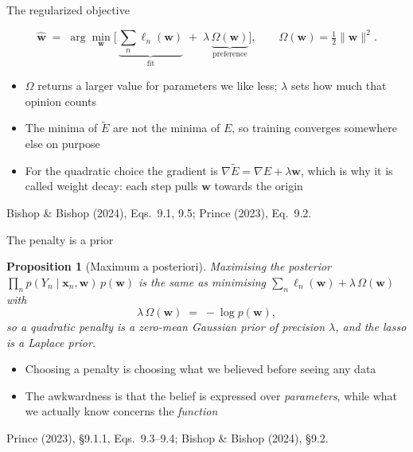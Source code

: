 \documentclass[aspectratio=169, 11pt]{beamer}
\newtheorem{propx}[theorem]{Proposition}
\newcommand{\srcline}[1]{%
  \par\vspace{0.25em}%
  {\scriptsize\color{mcMuted}\hfill #1\par}}
\newcommand{\src}[3]{}      %
\begin{document}
\begin{frame}{The regularized objective}
  \src{bishop2024}{equation}{9.1}
  \src{bishop2024}{equation}{9.5}
  \src{bishop2024}{section}{9.2}
  \src{prince2023}{equation}{9.2}
  \src{prince2023}{section}{9.1}
  \vspace{-0.2em}
  \[
    \hat{\mathbf{w}} \;=\; \arg\min_{\mathbf{w}}
      \Big[\, \underbrace{\textstyle\sum_{n} \ell_n(\mathbf{w})}_{\text{fit}}
        \;+\; \lambda\, \underbrace{\Omega(\mathbf{w})}_{\text{preference}} \Big],
    \qquad
    \Omega(\mathbf{w}) = \tfrac12 \|\mathbf{w}\|^2 .
  \]
  \vspace{-0.5em}
  \begin{itemize}\itemsep0.32em
    \item $\Omega$ returns a larger value for parameters we like less;
          $\lambda$ sets how much that opinion counts
    \item The minima of $\widetilde{E}$ are not the minima of $E$, so
          training converges somewhere else on purpose
    \item For the quadratic choice the gradient is
          $\nabla \widetilde{E} = \nabla E + \lambda\mathbf{w}$, which is why it
          is called \alert{weight decay}: each step pulls $\mathbf{w}$ towards
          the origin
  \end{itemize}
  \srcline{Bishop \& Bishop (2024), Eqs.~9.1, 9.5; Prince (2023), Eq.~9.2.}
\end{frame}

\begin{frame}{The penalty is a prior}
  \src{prince2023}{equation}{9.3-9.4}
  \src{prince2023}{section}{9.1.1}
  \src{bishop2024}{section}{9.2}
  \vspace{-0.15em}
  \begin{propx}[Maximum a posteriori]\label{th:map}
    \small
    Maximising the posterior
    $\prod_n p(Y_n \mid \mathbf{x}_n, \mathbf{w})\, p(\mathbf{w})$
    is the same as minimising
    $\sum_n \ell_n(\mathbf{w}) + \lambda\,\Omega(\mathbf{w})$
    with
    \[
      \lambda\,\Omega(\mathbf{w}) \;=\; -\log p(\mathbf{w}),
    \]
    so a quadratic penalty is a zero-mean Gaussian prior of precision
    $\lambda$, and the lasso is a Laplace prior.
  \end{propx}
  \vspace{0.3em}
  \begin{itemize}\itemsep0.28em
    \item Choosing a penalty is choosing what we believed before seeing
          any data
    \item The awkwardness is that the belief is expressed over
          \emph{parameters}, while what we actually know concerns the
          \emph{function}
  \end{itemize}
  \srcline{Prince (2023), \S9.1.1, Eqs.~9.3--9.4; Bishop \& Bishop (2024), \S9.2.}
\end{frame}
\end{document}
